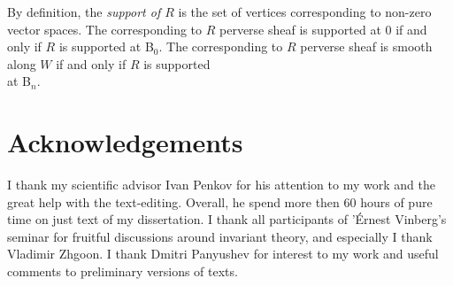 \documentclass[12pt]{amsart}
\theoremstyle{definition}\newtheorem{theorem}{Theorem}[section]
\theoremstyle{definition}\newtheorem{definition}[proposition]{Definition}
\theoremstyle{remark}\newtheorem{example}[proposition]{Example}
\begin{document}
By definition, the {\it support of $R$} is the set of vertices corresponding to non-zero vector spaces. The corresponding to $R$ perverse sheaf is supported at 0 if and only if $R$ is supported at B$_0$. The corresponding to $R$ perverse sheaf is smooth along $W$ if and only if $R$ is supported \\at B$_n$.
\newpage\section{Acknowledgements}
I thank my scientific advisor Ivan Penkov for his attention to my work and the great help with the text-editing. Overall, he spend more then 60 hours of pure time on just text of my dissertation. I thank all participants of '\'Ernest Vinberg's seminar for fruitful discussions around invariant theory, and especially I thank Vladimir Zhgoon. I thank Dmitri Panyushev for interest to my work and useful comments to preliminary versions of texts.
\end{document}
